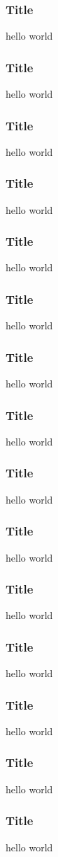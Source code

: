 \documentclass[12pt]{beamer}
\begin{document}
\begin{frame}
\frametitle{Title}
hello world
\end{frame}

\begin{frame}
\frametitle{Title}
hello world
\end{frame}

\begin{frame}
\frametitle{Title}
hello world
\end{frame}

\begin{frame}
\frametitle{Title}
hello world
\end{frame}

\begin{frame}
\frametitle{Title}
hello world
\end{frame}

\begin{frame}
\frametitle{Title}
hello world
\end{frame}

\begin{frame}
\frametitle{Title}
hello world
\end{frame}

\begin{frame}
\frametitle{Title}
hello world
\end{frame}

\begin{frame}
\frametitle{Title}
hello world
\end{frame}

\begin{frame}
\frametitle{Title}
hello world
\end{frame}

\begin{frame}
\frametitle{Title}
hello world
\end{frame}

\begin{frame}
\frametitle{Title}
hello world
\end{frame}

\begin{frame}
\frametitle{Title}
hello world
\end{frame}

\begin{frame}
\frametitle{Title}
hello world
\end{frame}

\begin{frame}
\frametitle{Title}
hello world
\end{frame}
\end{document}
